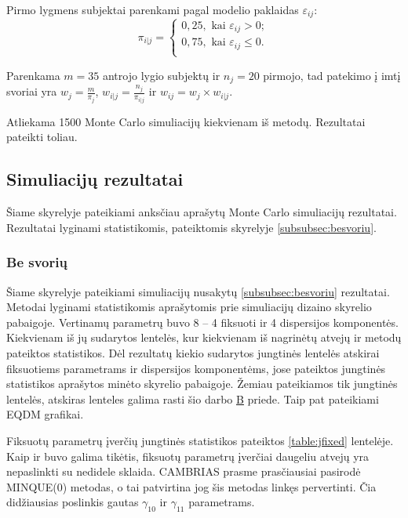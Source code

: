 \documentclass[11pt,a4paper]{article}
\begin{document}
\indent Pirmo lygmens subjektai parenkami pagal modelio paklaidas $\varepsilon_{ij}$:
\begin{equation*}
\pi_{i|j}=
\left\{
\begin{array}{l}
0,25, \text{ kai } \varepsilon_{ij}>0;\\
0,75, \text{ kai } \varepsilon_{ij}\leq0.\\

\end{array} \right.
\end{equation*}

\indent Parenkama $m=35$ antrojo lygio subjektų ir $n_j=20$ pirmojo, tad patekimo į imtį svoriai yra $w_j=\frac{m}{\pi_j}$, $w_{i|j}=\frac{n_j}{\pi_{i|j}}$ ir $w_{ij}=w_j\times w_{i|j}$.

\indent Atliekama 1500 Monte Carlo simuliacijų kiekvienam iš metodų. Rezultatai pateikti toliau.


\subsection{Simuliacijų rezultatai}
\indent Šiame skyrelyje pateikiami anksčiau aprašytų Monte Carlo simuliacijų rezultatai. Rezultatai lyginami statistikomis, pateiktomis skyrelyje \ref{subsubsec:besvoriu}.

\subsubsection*{Be svorių}
\indent Šiame skyrelyje pateikiami simuliacijų nusakytų \ref{subsubsec:besvoriu} rezultatai. Metodai lyginami statistikomis aprašytomis prie simuliacijų dizaino skyrelio pabaigoje. Vertinamų parametrų buvo 8 -- 4 fiksuoti ir 4 dispersijos komponentės. Kiekvienam iš jų sudarytos lentelės, kur kiekvienam iš nagrinėtų atvejų ir metodų pateiktos statistikos. Dėl rezultatų kiekio sudarytos jungtinės lentelės atskirai fiksuotiems parametrams ir dispersijos komponentėms, jose pateiktos jungtinės statistikos aprašytos minėto skyrelio pabaigoje. Žemiau pateikiamos tik jungtinės lentelės, atskiras lenteles galima rasti šio darbo \hyperlink{appendixb}{B} priede. Taip pat pateikiami  EQDM grafikai.

\indent Fiksuotų parametrų įverčių jungtinės statistikos pateiktos \ref{table:jfixed} lentelėje. Kaip ir buvo galima tikėtis, fiksuotų parametrų įverčiai daugeliu atvejų yra nepaslinkti su nedidele sklaida. CAMBRIAS prasme prasčiausiai pasirodė MINQUE(0) metodas, o tai patvirtina jog šis metodas linkęs pervertinti. Čia didžiausias poslinkis gautas $\gamma_{10}$ ir $\gamma_{11}$ parametrams.
\end{document}
